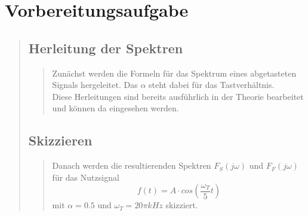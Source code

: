 \section{Vorbereitungsaufgabe}
\begin{quote}
    \subsection{Herleitung der Spektren}
    \begin{quote}
        Zunächst werden die Formeln für das Spektrum eines abgetasteten Signals
        hergeleitet. Das $\alpha$ steht dabei für das Tastverhältnis.\\
        Diese Herleitungen sind bereits ausführlich in der Theorie bearbeitet
        und können da eingesehen werden.
        
    \end{quote}  %
    \subsection{Skizzieren}
    \begin{quote}
                
        Danach werden die resultierenden Spektren $F_S (j\omega)$ und $F_F (j\omega)$
        für das Nutzsignal
        \begin{equation*}
        f(t) = A \cdot cos(\frac{\omega_T}{5}t)     
        \end{equation*}
		mit $\alpha = 0.5$ und $\omega_T = 20\pi kHz$ skizziert.
        

\end{quote}
\end{quote}
